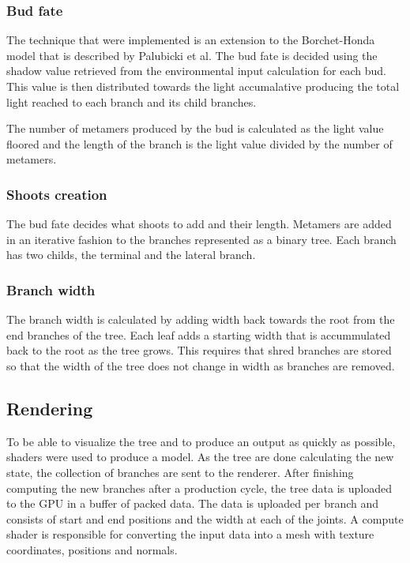 \documentclass[11pt]{article} %
\begin{document}
\subsubsection{Bud fate}
The technique that were implemented is an extension to the Borchet-Honda model that is described by Palubicki et al.\cite{Palubicki:2009:STM:1531326.1531364}
The bud fate is decided using the shadow value retrieved from the environmental input calculation for each bud.
This value is then distributed towards the light accumalative producing the total light reached to each branch and its child branches.

The number of metamers produced by the bud is calculated as the light value floored and the length of the branch is the light value divided by the number of metamers.

\subsubsection{Shoots creation}
The bud fate decides what shoots to add and their length.
Metamers are added in an iterative fashion to the branches represented as a binary tree.
Each branch has two childs, the terminal and the lateral branch.

\subsubsection{Branch width}
The branch width is calculated by adding width back towards the root from the end branches of the tree.
Each leaf adds a starting width that is accummulated back to the root as the tree grows.
This requires that shred branches are stored so that the width of the tree does not change in width as branches are removed.

\subsection{Rendering}
To be able to visualize the tree and to produce an output as quickly as possible, shaders were used to produce a model.
As the tree are done calculating the new state, the collection of branches are sent to the renderer.
After finishing computing the new branches after a production cycle, the tree data is uploaded to the GPU in a buffer of packed data.
The data is uploaded per branch and consists of start and end positions and the width at each of the joints.
A compute shader is responsible for converting the input data into a mesh with texture coordinates, positions and normals.
\end{document}
